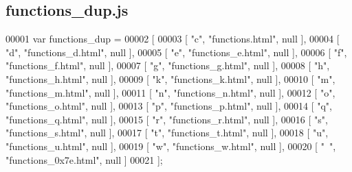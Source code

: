 \subsection{functions\+\_\+dup.\+js}
\label{functions__dup_8js_source}

\begin{DoxyCode}
00001 var functions_dup =
00002 [
00003     [ \textcolor{stringliteral}{"c"}, \textcolor{stringliteral}{"functions.html"}, null ],
00004     [ \textcolor{stringliteral}{"d"}, \textcolor{stringliteral}{"functions\_d.html"}, null ],
00005     [ \textcolor{stringliteral}{"e"}, \textcolor{stringliteral}{"functions\_e.html"}, null ],
00006     [ \textcolor{stringliteral}{"f"}, \textcolor{stringliteral}{"functions\_f.html"}, null ],
00007     [ \textcolor{stringliteral}{"g"}, \textcolor{stringliteral}{"functions\_g.html"}, null ],
00008     [ \textcolor{stringliteral}{"h"}, \textcolor{stringliteral}{"functions\_h.html"}, null ],
00009     [ \textcolor{stringliteral}{"k"}, \textcolor{stringliteral}{"functions\_k.html"}, null ],
00010     [ \textcolor{stringliteral}{"m"}, \textcolor{stringliteral}{"functions\_m.html"}, null ],
00011     [ \textcolor{stringliteral}{"n"}, \textcolor{stringliteral}{"functions\_n.html"}, null ],
00012     [ \textcolor{stringliteral}{"o"}, \textcolor{stringliteral}{"functions\_o.html"}, null ],
00013     [ \textcolor{stringliteral}{"p"}, \textcolor{stringliteral}{"functions\_p.html"}, null ],
00014     [ \textcolor{stringliteral}{"q"}, \textcolor{stringliteral}{"functions\_q.html"}, null ],
00015     [ \textcolor{stringliteral}{"r"}, \textcolor{stringliteral}{"functions\_r.html"}, null ],
00016     [ \textcolor{stringliteral}{"s"}, \textcolor{stringliteral}{"functions\_s.html"}, null ],
00017     [ \textcolor{stringliteral}{"t"}, \textcolor{stringliteral}{"functions\_t.html"}, null ],
00018     [ \textcolor{stringliteral}{"u"}, \textcolor{stringliteral}{"functions\_u.html"}, null ],
00019     [ \textcolor{stringliteral}{"w"}, \textcolor{stringliteral}{"functions\_w.html"}, null ],
00020     [ \textcolor{stringliteral}{"~"}, \textcolor{stringliteral}{"functions\_0x7e.html"}, null ]
00021 ];
\end{DoxyCode}
